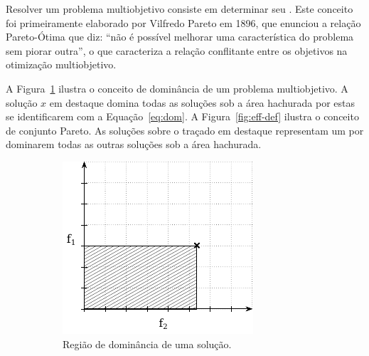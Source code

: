 Resolver um problema multiobjetivo consiste em determinar seu \paretoset{}.
Este conceito foi primeiramente elaborado por Vilfredo Pareto em 1896, que
enunciou a relação Pareto-Ótima que diz: ``não é possível melhorar uma característica
do problema sem piorar outra'', o que caracteriza a relação conflitante entre os
objetivos na otimização multiobjetivo.

A Figura~\ref{fig:dom-def} ilustra o conceito de dominância de um problema multiobjetivo.
A solução $x$ em destaque domina todas as soluções sob a área hachurada
por estas se identificarem com a Equação~\ref{eq:dom}.
A Figura~\ref{fig:eff-def} ilustra o conceito de conjunto Pareto.
As soluções sobre o traçado em destaque representam um \paretoset{} por
dominarem todas as outras soluções sob a área hachurada.

\begin{figure}[H]
    \centering
    \begin{subfigure}[t]{0.3\textwidth}
        \includegraphics[width=\textwidth]{img/mokp/dom-def}
        \caption{Região de dominância de uma solução.}
        \label{fig:dom-def}
    \end{subfigure}
    \qquad
    \begin{subfigure}[t]{0.3\textwidth}

\end{subfigure}
\end{figure}
